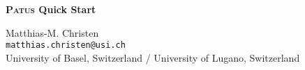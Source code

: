 

\pagestyle{empty}
\sffamily

\begin{center}
    \Huge\bfseries
    \textsc{Patus} Quick Start
\end{center}

\vfill
\begin{center}
	\Large
	Matthias-M. Christen\\
	\texttt{matthias.christen@usi.ch}\\
	University of Basel, Switzerland / University of Lugano, Switzerland
\end{center}


\cleardoublepage

\rmfamily
\normalfont

\pagestyle{headings}
\tableofcontents

